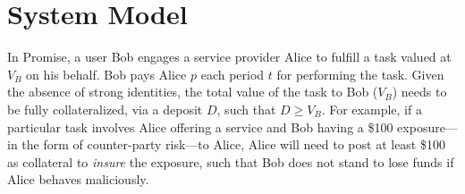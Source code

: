 \documentclass[runningheads]{llncs}
\newcommand{\sys}{Promise\xspace}
\newcommand{\dom}[1]{\todo[linecolor=green,backgroundcolor=green!25,bordercolor=green,inline,caption={}]{Comment by Dominik: #1}}
\begin{document}








\section{System Model}
\label{sec:model}

In \sys, a user Bob engages a service provider Alice to fulfill a task valued at $V_B$ on his behalf.
Bob pays Alice $p$ each period $t$ for performing the task. %
Given the absence of strong identities, the total value of the task to Bob ($V_B$) needs to be fully collateralized, via a deposit $D$, such that $D \geq V_B$.
For example, if a particular task involves Alice offering a service and Bob having a \$100 exposure---in the form of counter-party risk---to Alice, Alice will need to post at least \$100 as collateral to \textit{insure} the exposure, such that Bob does not stand to lose funds if Alice behaves maliciously. %
\end{document}
